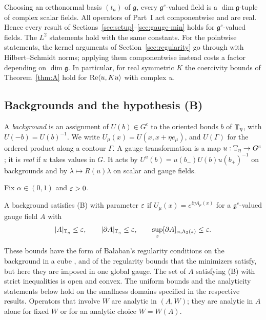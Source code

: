 Choosing an orthonormal basis $(t_a)$ of $\mathfrak g$, every $\mathfrak g^c$-valued field is a $\dim\mathfrak g$-tuple of complex scalar fields. All operators of Part~I act componentwise and are real. Hence every result of Sections~\ref{sec:setup}--\ref{sec:gauge-min} holds for $\mathfrak g^c$-valued fields. The $L^2$ statements hold with the same constants. For the pointwise statements, the kernel arguments of Section~\ref{sec:regularity} go through with Hilbert--Schmidt norms; applying them componentwise instead costs a factor depending on $\dim\mathfrak g$. In particular, for real symmetric $K$ the coercivity bounds of Theorem~\ref{thm:A} hold for $\operatorname{Re}\langle u,Ku\rangle$ with complex $u$.

\subsection{Backgrounds and the hypothesis (B)}\label{ss:12.2}

A \emph{background} is an assignment of $U(b)\in G^c$ to the oriented bonds $b$ of $\mathbb T_\eta$, with $U(-b)=U(b)^{-1}$. We write $U_\mu(x)=U(x,x+\eta e_\mu)$, and $U(\Gamma)$ for the ordered product along a contour $\Gamma$. A gauge transformation is a map $u:\mathbb T_\eta\to G^c$; it is \emph{real} if $u$ takes values in $G$. It acts by $U^u(b)=u(b_-)U(b)u(b_+)^{-1}$ on backgrounds and by $\lambda\mapsto R(u)\lambda$ on scalar and gauge fields.

Fix $\alpha\in(0,1)$ and $\varepsilon>0$.

\begin{definition}[Hypothesis (B)]\label{x:12.1}
A background satisfies (B) with parameter $\varepsilon$ if $U_\mu(x)=e^{\ii\eta A_\mu(x)}$ for a $\mathfrak g^c$-valued gauge field $A$ with
\[
|A|_{\mathbb T_\eta}\le\varepsilon,\qquad|\partial A|_{\mathbb T_\eta}\le\varepsilon,\qquad\sup_z[\partial A]_{\alpha,\Lambda_3(z)}\le\varepsilon .
\]
\end{definition}

These bounds have the form of Ba\l aban's regularity conditions on the background in a cube \cite[(3.35)--(3.36)]{BalBackground}, and of the regularity bounds \cite[(9)]{BalVar} that the minimizers satisfy, but here they are imposed in one global gauge. The set of $A$ satisfying (B) with strict inequalities is open and convex. The uniform bounds and the analyticity statements below hold on the smallness domains specified in the respective results. Operators that involve $W$ are analytic in $(A,W)$; they are analytic in $A$ alone for fixed $W$ or for an analytic choice $W=W(A)$.

